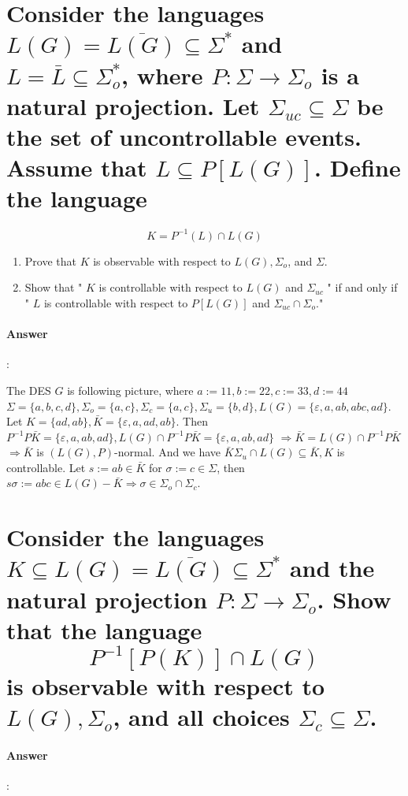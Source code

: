 \documentclass{article}
\begin{document}
\section{Consider the languages $L(G)=\overline{L(G)} \subseteq \Sigma^*$ and $L=\bar{L} \subseteq \Sigma_o^*$, where $P: \Sigma \rightarrow \Sigma_o$ is a natural projection. Let $\Sigma_{u c} \subseteq \Sigma$ be the set of uncontrollable events. Assume that $L \subseteq P[L(G)]$. Define the language}

$$
K=P^{-1}(L) \cap L(G)
$$

\begin{enumerate}
  \item Prove that $K$ is observable with respect to $L(G), \Sigma_o$, and $\Sigma$.
  \item Show that " $K$ is controllable with respect to $L(G)$ and $\Sigma_{u c}$ " if and only if " $L$ is controllable with respect to $P[L(G)]$ and $\Sigma_{u c} \cap \Sigma_o$."
\end{enumerate}

\paragraph{Answer}:

The DES $G$ is following picture, where $a:=11, b:=22, c:=33, d:=44$ $\Sigma=\{a, b, c, d\}, \Sigma_o=\{a, c\}, \Sigma_c=\{a, c\}, \Sigma_u=\{b, d\}, L(G)=\{\varepsilon, a, a b, a b c, a d\}$. Let $K=\{a d, a b\}, \bar{K}=\{\varepsilon, a, a d, a b\}$.
Then $P^{-1} P \bar{K}=\{\varepsilon, a, a b, a d\}, L(G) \cap P^{-1} P \bar{K}=\{\varepsilon, a, a b, a d\}$
$\Longrightarrow \bar{K}=L(G) \cap P^{-1} P \bar{K}$
$\Longrightarrow \bar{K}$ is $(L(G), P)$-normal.
And we have $\bar{K} \Sigma_u \cap L(G) \subseteq \bar{K}, K$ is controllable. Let $s:=a b \in \bar{K}$ for $\sigma:=c \in \Sigma$, then $s \sigma:=a b c \in L(G)-\bar{K} \Longrightarrow \sigma \in \Sigma_o \cap \Sigma_c$.

\section{Consider the languages $K \subseteq L(G)=\overline{L(G)} \subseteq \Sigma^*$ and the natural projection $P: \Sigma \rightarrow \Sigma_o$. Show that the language
$$
P^{-1}[P(K)] \cap L(G)
$$
is observable with respect to $L(G), \Sigma_o$, and all choices $\Sigma_c \subseteq \Sigma$.}

\paragraph{Answer}:
\end{document}
